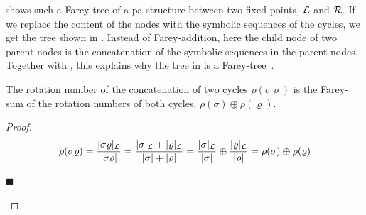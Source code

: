  shows such a Farey-tree of a \gls{pa} structure between two fixed points, $\mathcal{L}$ and $\mathcal{R}$.
If we replace the content of the nodes with the symbolic sequences of the cycles, we get the tree shown in .
Instead of Farey-addition, here the child node of two parent nodes is the concatenation of the symbolic sequences in the parent nodes.
Together with , this explains why the  tree in  is a Farey-tree~\cite{granados14adding}.

\begin{theorem}
	The rotation number of the concatenation of two cycles $\rho(\sigma\varrho)$ is the Farey-sum of the rotation numbers of both cycles, $\rho(\sigma) \oplus \rho(\varrho)$.
	\label{theorem:state.rot.num.concat}
\end{theorem}

\begin{proof}
	\begin{align*}
		\rho(\sigma\varrho)
		= \dfrac{|\sigma\varrho|_{\mathcal{L}}}{|\sigma\varrho|}
		= \dfrac{|\sigma|_{\mathcal{L}} + |\varrho|_{\mathcal{L}}}{|\sigma| + |\varrho|}
		= \dfrac{|\sigma|_{\mathcal{L}}}{|\sigma|} \oplus \dfrac{|\varrho|_{\mathcal{L}}}{|\varrho|}
		= \rho(\sigma) \oplus \rho(\varrho)
	\end{align*}
	\vspace{-4.8em}
	\begin{flushright}
		$\blacksquare$
	\end{flushright}
\end{proof}

